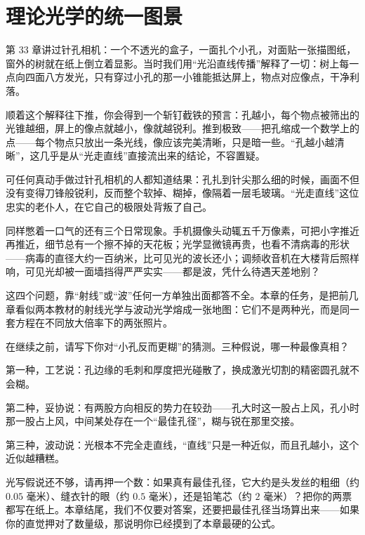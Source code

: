 \chapter{理论光学的统一图景}


第 33 章讲过针孔相机：一个不透光的盒子，一面扎个小孔，对面贴一张描图纸，窗外的树就在纸上倒立着显影。当时我们用“光沿直线传播”解释了一切：树上每一点向四面八方发光，只有穿过小孔的那一小锥能抵达屏上，物点对应像点，干净利落。

顺着这个解释往下推，你会得到一个斩钉截铁的预言：孔越小，每个物点被筛出的光锥越细，屏上的像点就越小，像就越锐利。推到极致——把孔缩成一个数学上的点——每个物点只放出一条光线，像应该完美清晰，只是暗一些。“孔越小越清晰”，这几乎是从“光走直线”直接流出来的结论，不容置疑。

可任何真动手做过针孔相机的人都知道结果：孔扎到针尖那么细的时候，画面不但没有变得刀锋般锐利，反而整个软掉、糊掉，像隔着一层毛玻璃。“光走直线”这位忠实的老仆人，在它自己的极限处背叛了自己。

同样憋着一口气的还有三个日常现象。手机摄像头动辄五千万像素，可把小字推近再推近，细节总有一个擦不掉的天花板；光学显微镜再贵，也看不清病毒的形状——病毒的直径大约一百纳米，比可见光的波长还小；调频收音机在大楼背后照样响，可见光却被一面墙挡得严严实实——都是波，凭什么待遇天差地别？

这四个问题，靠“射线”或“波”任何一方单独出面都答不全。本章的任务，是把前几章看似两本教材的射线光学与波动光学熔成一张地图：它们不是两种光，而是同一套方程在不同放大倍率下的两张照片。


在继续之前，请写下你对“小孔反而更糊”的猜测。三种假说，哪一种最像真相？

第一种，工艺说：孔边缘的毛刺和厚度把光碰散了，换成激光切割的精密圆孔就不会糊。

第二种，妥协说：有两股方向相反的势力在较劲——孔大时这一股占上风，孔小时那一股占上风，中间某处存在一个“最佳孔径”，糊与锐在那里交接。

第三种，波动说：光根本不完全走直线，“直线”只是一种近似，而且孔越小，这个近似越糟糕。

光写假说还不够，请再押一个数：如果真有最佳孔径，它大约是头发丝的粗细（约 \(0.05\) 毫米）、缝衣针的眼（约 \(0.5\) 毫米），还是铅笔芯（约 \(2\) 毫米）？把你的两票都写在纸上。本章结尾，我们不仅要对答案，还要把最佳孔径当场算出来——如果你的直觉押对了数量级，那说明你已经摸到了本章最硬的公式。



